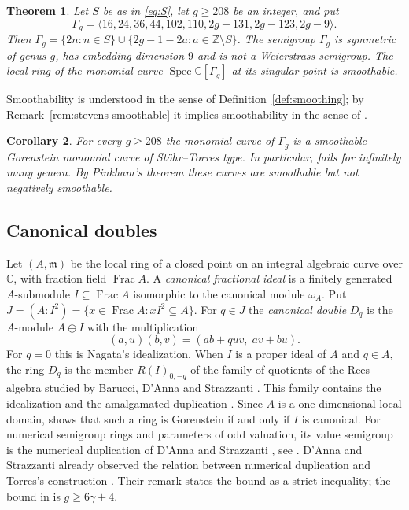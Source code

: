 \documentclass{amsart}
\newtheorem{theorem}{Theorem}[section]
\newtheorem{corollary}[theorem]{Corollary}
\theoremstyle{definition}
\theoremstyle{remark}
\numberwithin{equation}{section}
\newcommand{\C}{\mathbb{C}}
\newcommand{\Z}{\mathbb{Z}}
\newcommand{\m}{\mathfrak{m}}
\DeclareMathOperator{\Spec}{Spec}
\DeclareMathOperator{\Frac}{Frac}
\begin{document}
\begin{theorem}\label{thm:main}
Let $S$ be as in \eqref{eq:S}, let $g\ge 208$ be an integer, and put
\[
\Gamma_g=\langle 16,24,36,44,102,110,2g-131,2g-123,2g-9\rangle .
\]
Then $\Gamma_g=\{2n:n\in S\}\cup\{2g-1-2a:a\in\Z\setminus S\}$. The semigroup $\Gamma_g$ is symmetric of genus $g$, has embedding dimension $9$ and is not a Weierstrass semigroup. The local ring of the monomial curve $\Spec\C[\Gamma_g]$ at its singular point is smoothable.
\end{theorem}

Smoothability is understood in the sense of Definition~\ref{def:smoothing}; by Remark~\ref{rem:stevens-smoothable} it implies smoothability in the sense of \cite{Ste}.

\begin{corollary}\label{cor:conj}
For every $g\ge 208$ the monomial curve of $\Gamma_g$ is a smoothable Gorenstein monomial curve of St\"ohr--Torres type. In particular, \cite[Conjecture~4.3]{Ste} fails for infinitely many genera. By Pinkham's theorem these curves are smoothable but not negatively smoothable.
\end{corollary}

\subsection*{Canonical doubles}
Let $(A,\m)$ be the local ring of a closed point on an integral algebraic curve over $\C$, with fraction field $\Frac A$. A \emph{canonical fractional ideal} is a finitely generated $A$-submodule $I\subseteq\Frac A$ isomorphic to the canonical module $\omega_A$. Put $J=(A:I^2)=\{x\in\Frac A: xI^2\subseteq A\}$. For $q\in J$ the \emph{canonical double} $D_q$ is the $A$-module $A\oplus I$ with the multiplication
\begin{equation}\label{eq:Dq}
(a,u)(b,v)=(ab+quv,\;av+bu).
\end{equation}
For $q=0$ this is Nagata's idealization. When $I$ is a proper ideal of $A$ and $q\in A$, the ring $D_q$ is the member $R(I)_{0,-q}$ of the family of quotients of the Rees algebra studied by Barucci, D'Anna and Strazzanti \cite{BDS}. This family contains the idealization and the amalgamated duplication \cite[Propositions~1.4 and~1.5]{BDS}. Since $A$ is a one-dimensional local domain, \cite[Corollary~3.3]{BDS} shows that such a ring is Gorenstein if and only if $I$ is canonical. For numerical semigroup rings and parameters of odd valuation, its value semigroup is the numerical duplication of D'Anna and Strazzanti \cite{DS}, see \cite[Theorems~3.4 and~3.6]{BDS}. D'Anna and Strazzanti already observed the relation between numerical duplication and Torres's construction \cite[Remark~2.3]{DS}. Their remark states the bound as a strict inequality; the bound in \cite[p.~48]{Tor} is $g\ge 6\gamma+4$.
\end{document}
